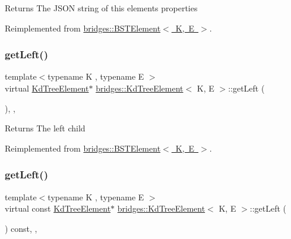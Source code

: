 \begin{DoxyReturn}{Returns}
The J\+S\+ON string of this element\textquotesingle{}s properties 
\end{DoxyReturn}


Reimplemented from \mbox{\hyperlink{classbridges_1_1_b_s_t_element_a623d1495a0d27090dc3fc515d148f381}{bridges\+::\+B\+S\+T\+Element$<$ K, E $>$}}.

\mbox{\label{classbridges_1_1_kd_tree_element_ad7db63a4f82f5252c7e0809ac6486cb4}} 
\subsubsection{\texorpdfstring{get\+Left()}{getLeft()}\hspace{0.1cm}{\footnotesize\ttfamily [1/2]}}
{\footnotesize\ttfamily template$<$typename K , typename E $>$ \\
virtual \mbox{\hyperlink{classbridges_1_1_kd_tree_element}{Kd\+Tree\+Element}}$\ast$ \mbox{\hyperlink{classbridges_1_1_kd_tree_element}{bridges\+::\+Kd\+Tree\+Element}}$<$ K, E $>$\+::get\+Left (\begin{DoxyParamCaption}{ }\end{DoxyParamCaption})\hspace{0.3cm}{\ttfamily [inline]}, {\ttfamily [override]}, {\ttfamily [virtual]}}

\begin{DoxyReturn}{Returns}
The left child 
\end{DoxyReturn}


Reimplemented from \mbox{\hyperlink{classbridges_1_1_b_s_t_element_a4d8987373c75b51fca94e3c0b78b87a6}{bridges\+::\+B\+S\+T\+Element$<$ K, E $>$}}.

\mbox{\label{classbridges_1_1_kd_tree_element_ab58af4ca67cb3869c279bfc11952c070}} 
\subsubsection{\texorpdfstring{get\+Left()}{getLeft()}\hspace{0.1cm}{\footnotesize\ttfamily [2/2]}}
{\footnotesize\ttfamily template$<$typename K , typename E $>$ \\
virtual const \mbox{\hyperlink{classbridges_1_1_kd_tree_element}{Kd\+Tree\+Element}}$\ast$ \mbox{\hyperlink{classbridges_1_1_kd_tree_element}{bridges\+::\+Kd\+Tree\+Element}}$<$ K, E $>$\+::get\+Left (\begin{DoxyParamCaption}{ }\end{DoxyParamCaption}) const\hspace{0.3cm}{\ttfamily [inline]}, {\ttfamily [override]}, {\ttfamily [virtual]}}

